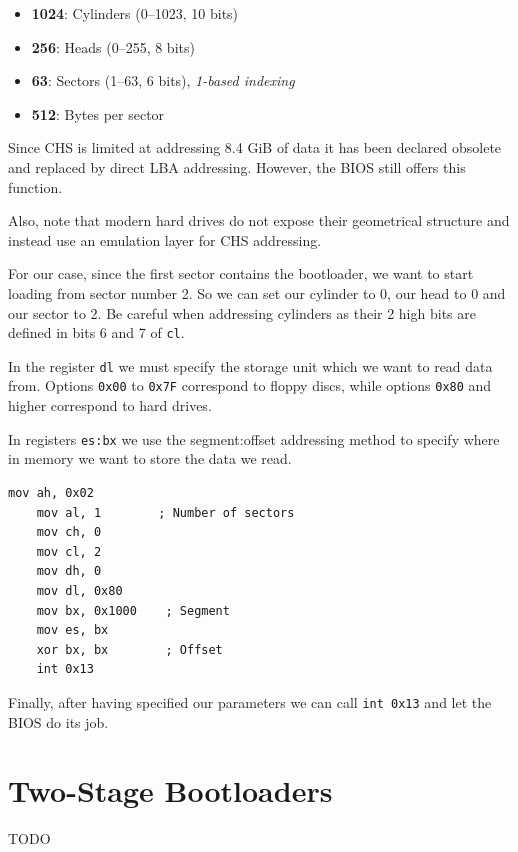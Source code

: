 \begin{itemize}
    \item \textbf{1024}: Cylinders (0–1023, 10 bits)
    \item \textbf{256}: Heads (0–255, 8 bits)
    \item \textbf{63}: Sectors (1–63, 6 bits), \textit{1-based indexing}
    \item \textbf{512}: Bytes per sector
\end{itemize}

Since CHS is limited at addressing 8.4 GiB of data it has been declared obsolete and replaced by direct LBA addressing.
However, the BIOS still offers this function.

Also, note that modern hard drives do not expose their geometrical structure and instead use an emulation layer for
CHS addressing.

For our case, since the first sector contains the bootloader, we want to start loading from sector number 2.
So we can set our cylinder to 0, our head to 0 and our sector to 2. Be careful when addressing cylinders
as their 2 high bits are defined in bits 6 and 7 of \texttt{cl}.

In the register \texttt{dl} we must specify the storage unit which we want to read data from.
Options \texttt{0x00} to \texttt{0x7F} correspond to floppy discs, while options \texttt{0x80} and higher
correspond to hard drives.

In registers \texttt{es:bx} we use the segment:offset addressing method to specify where in memory we want
to store the data we read.

\begin{lstlisting}[caption={Assembly to load the kernel}]
    mov ah, 0x02
    mov al, 1        ; Number of sectors
    mov ch, 0
    mov cl, 2
    mov dh, 0
    mov dl, 0x80
    mov bx, 0x1000    ; Segment
    mov es, bx
    xor bx, bx        ; Offset
    int 0x13
\end{lstlisting}

Finally, after having specified our parameters we can call \texttt{int 0x13} and let the BIOS do its job.


\section{Two-Stage Bootloaders}

TODO

